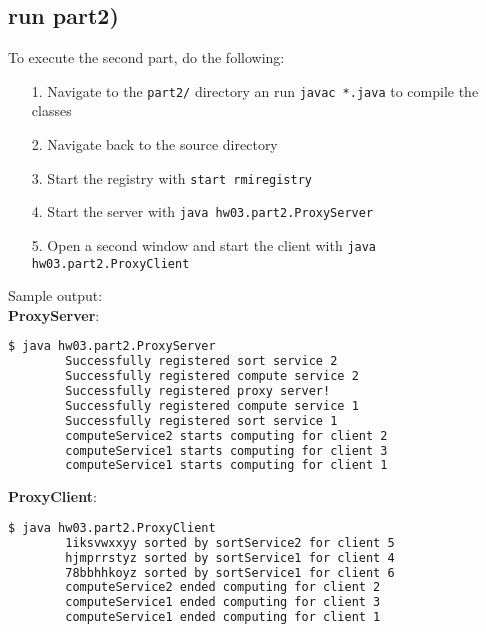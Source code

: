 \documentclass{article}
\begin{document}
    \subsection*{run part2)}
    
      To execute the second part, do the following:
      \begin{itemize}
        \item[1.] Navigate to the \texttt{part2/} directory an run \texttt{javac *.java} to compile the classes
    	\item[2.] Navigate back to the source directory
    	\item[3.] Start the registry with \texttt{start rmiregistry}
    	\item[4.] Start the server with \texttt{java hw03.part2.ProxyServer}
    	\item[5.] Open a second window and start the client with \texttt{java hw03.part2.ProxyClient}
      \end{itemize}
      Sample output:\\
      \textbf{ProxyServer}:\\
      \begin{lstlisting}[language=sh]
        $ java hw03.part2.ProxyServer
        Successfully registered sort service 2
        Successfully registered compute service 2
        Successfully registered proxy server!
        Successfully registered compute service 1
        Successfully registered sort service 1
        computeService2 starts computing for client 2
        computeService1 starts computing for client 3
        computeService1 starts computing for client 1
      \end{lstlisting}
      \textbf{ProxyClient}:\\
      \begin{lstlisting}[language=sh]
        $ java hw03.part2.ProxyClient
        1iksvwxxyy sorted by sortService2 for client 5
        hjmprrstyz sorted by sortService1 for client 4
        78bbhhkoyz sorted by sortService1 for client 6
        computeService2 ended computing for client 2
        computeService1 ended computing for client 3
        computeService1 ended computing for client 1
      \end{lstlisting}
	
\end{document}

